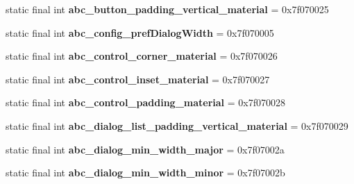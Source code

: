 \begin{DoxyCompactItemize}
\item 
\hypertarget{classandroid_1_1support_1_1design_1_1_r_1_1dimen_a15726a35ff8b417641bbc00e360df277}{}static final int {\bfseries abc\+\_\+button\+\_\+padding\+\_\+vertical\+\_\+material} = 0x7f070025\label{classandroid_1_1support_1_1design_1_1_r_1_1dimen_a15726a35ff8b417641bbc00e360df277}

\item 
\hypertarget{classandroid_1_1support_1_1design_1_1_r_1_1dimen_ada9bce90209861ef96ac780cc525730c}{}static final int {\bfseries abc\+\_\+config\+\_\+pref\+Dialog\+Width} = 0x7f070005\label{classandroid_1_1support_1_1design_1_1_r_1_1dimen_ada9bce90209861ef96ac780cc525730c}

\item 
\hypertarget{classandroid_1_1support_1_1design_1_1_r_1_1dimen_a309e3353e64253f83debdb45d1449e74}{}static final int {\bfseries abc\+\_\+control\+\_\+corner\+\_\+material} = 0x7f070026\label{classandroid_1_1support_1_1design_1_1_r_1_1dimen_a309e3353e64253f83debdb45d1449e74}

\item 
\hypertarget{classandroid_1_1support_1_1design_1_1_r_1_1dimen_a2be8e6d98d31e9f2a87de1071f804927}{}static final int {\bfseries abc\+\_\+control\+\_\+inset\+\_\+material} = 0x7f070027\label{classandroid_1_1support_1_1design_1_1_r_1_1dimen_a2be8e6d98d31e9f2a87de1071f804927}

\item 
\hypertarget{classandroid_1_1support_1_1design_1_1_r_1_1dimen_a8019524092bba937679a2feb43ed2dc0}{}static final int {\bfseries abc\+\_\+control\+\_\+padding\+\_\+material} = 0x7f070028\label{classandroid_1_1support_1_1design_1_1_r_1_1dimen_a8019524092bba937679a2feb43ed2dc0}

\item 
\hypertarget{classandroid_1_1support_1_1design_1_1_r_1_1dimen_a21d5b070cecbc9e8604e17ca90292be4}{}static final int {\bfseries abc\+\_\+dialog\+\_\+list\+\_\+padding\+\_\+vertical\+\_\+material} = 0x7f070029\label{classandroid_1_1support_1_1design_1_1_r_1_1dimen_a21d5b070cecbc9e8604e17ca90292be4}

\item 
\hypertarget{classandroid_1_1support_1_1design_1_1_r_1_1dimen_a15f18eb1f09e97f0916635c3b780e3d4}{}static final int {\bfseries abc\+\_\+dialog\+\_\+min\+\_\+width\+\_\+major} = 0x7f07002a\label{classandroid_1_1support_1_1design_1_1_r_1_1dimen_a15f18eb1f09e97f0916635c3b780e3d4}

\item 
\hypertarget{classandroid_1_1support_1_1design_1_1_r_1_1dimen_a6a73848d8d821f2d6fcf111851f69708}{}static final int {\bfseries abc\+\_\+dialog\+\_\+min\+\_\+width\+\_\+minor} = 0x7f07002b\label{classandroid_1_1support_1_1design_1_1_r_1_1dimen_a6a73848d8d821f2d6fcf111851f69708}


\end{DoxyCompactItemize}
